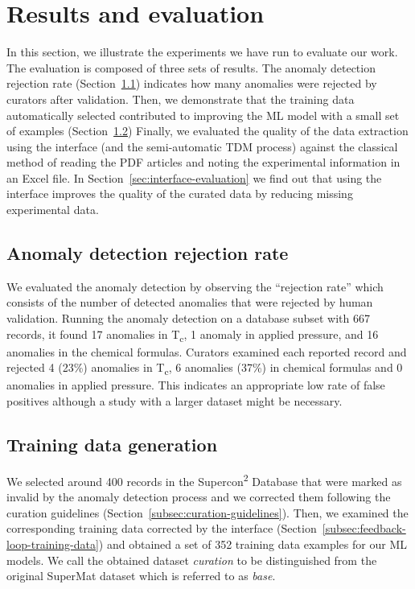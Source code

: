 \section{Results and evaluation}
\label{sec:results-and-evaluation}

In this section, we illustrate the experiments we have run to evaluate our work. 
The evaluation is composed of three sets of results. 
The anomaly detection rejection rate (Section~\ref{subsec:anomaly-detection-evaluation}) indicates how many anomalies were rejected by curators after validation. 
Then, we demonstrate that the training data automatically selected contributed to improving the ML model with a small set of examples (Section~\ref{subsec:training-data-generation-evaluation}) 
Finally, we evaluated the quality of the data extraction using the interface (and the semi-automatic TDM process) against the classical method of reading the PDF articles and noting the experimental information in an Excel file. In Section~\ref{sec:interface-evaluation} we find out that using the interface improves the quality of the curated data by reducing missing experimental data. 


\subsection{Anomaly detection rejection rate}
\label{subsec:anomaly-detection-evaluation}

We evaluated the anomaly detection by observing the ``rejection rate'' which consists of the number of detected anomalies that were rejected by human validation. 
Running the anomaly detection on a database subset with 667 records, it found 17 anomalies in T\textsubscript{c}, 1 anomaly in applied pressure, and 16 anomalies in the chemical formulas. 
Curators examined each reported record and rejected 4 (23\%) anomalies in T\textsubscript{c}, 6 anomalies (37\%) in chemical formulas and 0 anomalies in applied pressure. 
This indicates an appropriate low rate of false positives although a study with a larger dataset might be necessary. 

\subsection{Training data generation}
\label{subsec:training-data-generation-evaluation}
We selected around 400 records in the Supercon\textsuperscript{2} Database that were marked as invalid by the anomaly detection process and we corrected them following the curation guidelines (Section~\ref{subsec:curation-guidelines}).
Then, we examined the corresponding training data corrected by the interface (Section~\ref{subsec:feedback-loop-training-data}) and obtained a set of 352 training data examples for our ML models. 
We call the obtained dataset \emph{curation} to be distinguished from the original SuperMat dataset which is referred to as \emph{base}.


